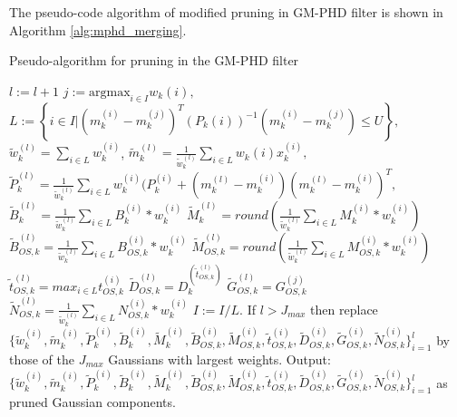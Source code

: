 The pseudo-code algorithm of modified pruning in GM-PHD filter is shown in Algorithm \ref{alg:mphd_merging}.
\begin{algorithm}
  \caption{Pseudo-algorithm for pruning in the GM-PHD filter}
  \begin{algorithmic}[1]
        \State $l:= l+1$
        \State $j:= \text{argmax}_{i \in I} w_k{(i)},$
        \State $L:= \left\{ i \in I | (m_k^{(i)} - m_k^{(j)})^T (P_k{(i)})^{-1} (m_k^{(i)} - m_k^{(j)}) \leq U \right\},$
        \State $\tilde{w}_k^{(l)} = \sum_{i \in L} w_k^{(i)}$,
        \State $\tilde{m}_k^{(l)} = \frac{1}{\tilde{w}_k^{(l)}} \sum_{i \in L} w_k{(i)} x_k^{(i)},$
        \State $\tilde{P}_k^{(l)} = \frac{1}{\tilde{w}_k^{(l)}} \sum_{i \in L} w_k^{(i)} (P_k^{(i)} + (m_k^{(l)} - m _k^{(i)}) (m_k^{(l)} - m _k^{(i)})^T,$
        \State $\tilde{B}_k^{(l)} = \frac{1}{\tilde{w}_k^{(l)}} \sum_{i \in L} B_k^{(i)} * w_k^{(i)}$
        \State $\tilde{M}_k^{(l)} = round(\frac{1}{\tilde{w}_k^{(l)}} \sum_{i \in L} M_k^{(i)} * w_k^{(i)})$
        \State $\tilde{B}_{OS,k}^{(l)} = \frac{1}{\tilde{w}_k^{(l)}} \sum_{i \in L} B_{OS,k}^{(i)} * w_k^{(i)}$ 
        \State $\tilde{M}_{OS,k}^{(l)} = round(\frac{1}{\tilde{w}_k^{(l)}} \sum_{i \in L} M_{OS,k}^{(i)} * w_k^{(i)})$
        \State $\tilde{t}_{OS,k}^{(l)} = max_{i \in L} t_{OS,k}^{(i)}$
        \State $\tilde{D}_{OS,k}^{(l)} = D_k^{(\tilde{t}_{OS,k}^{(l)})}$
        \State $\tilde{G}_{OS,k}^{(l)} = {G}_{OS,k}^{(j)}$ 
        \State $\tilde{N}_{OS,k}^{(l)} = \frac{1}{\tilde{w}_k^{(l)}} \sum_{i \in L} N_{OS,k}^{(i)} * w_k^{(i)}$
        \State $I:= I/L.$
      \EndWhile
    \EndProcedure
    \State
    \State If $l > J_{max}$ then replace $\{ \tilde{w}_k^{(i)}, \tilde{m}_k^{(i)}, \tilde{P}_k^{(i)}, \tilde{B}_k^{(i
    )}, \tilde{M}_k^{(i)}, \tilde{B}_{OS,k}^{(i)}, \tilde{M}_{OS,k}^{(i)}, \tilde{t}_{OS,k}^{(i)}, \tilde{D}_{OS,k}^{(i)}, \tilde{G}_{OS,k}^{(i)}, \tilde{N}_{OS,k}^{(i)} \}_{i=1}^l$ by
    those of the $J_{max}$ Gaussians with largest weights.
    \State
    \State Output: $\{ \tilde{w}_k^{(i)}, \tilde{m}_k^{(i)}, \tilde{P}_k^{(i)}, \tilde{B}_k^{(i
    )}, \tilde{M}_k^{(i)}, \tilde{B}_{OS,k}^{(i)}, \tilde{M}_{OS,k}^{(i)}, \tilde{t}_{OS,k}^{(i)}, \tilde{D}_{OS,k}^{(i)}, \tilde{G}_{OS,k}^{(i)}, \tilde{N}_{OS,k}^{(i)} \}_{i=1}^l$ as pruned Gaussian components.

  \end{algorithmic}
  \label{alg:mphd_merging}
\end{algorithm}
